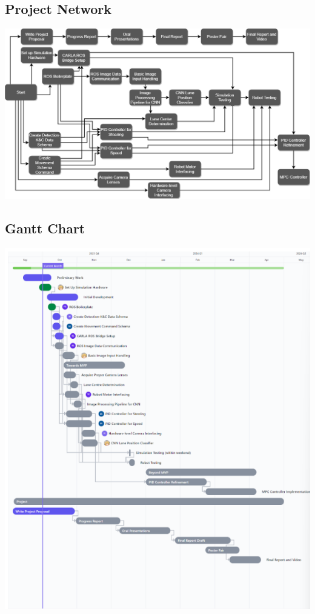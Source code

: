 \documentclass[titlepage]{article}
\begin{document}
\subsection{Project Network}
\includegraphics[width=10in,scale=1, angle=90, origin=c]{activity.png}
\subsection{Gantt Chart}
\includegraphics{gantt.PNG}
\end{document}
